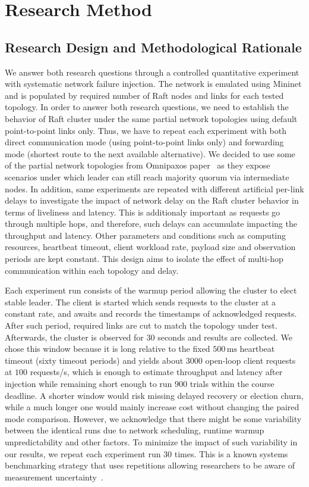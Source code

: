 \documentclass[11pt,a4paper]{article}
\begin{document}
\section{Research Method}

\subsection{Research Design and Methodological Rationale}

We answer both research questions through a controlled quantitative experiment with systematic network failure injection.
The network is emulated using Mininet and is populated by required number of Raft nodes and links for each tested topology.
In order to answer both research questions, we need to establish the behavior of Raft cluster under the same partial network topologies using default point-to-point links only.
Thus, we have to repeat each experiment with both direct communication mode (using point-to-point links only) and forwarding mode (shortest route to the next available alternative).
We decided to use some of the partial network topologies from Omnipaxos paper~\cite{ng2023omnipaxos} as they expose scenarios under which leader can still reach majority quorum via intermediate nodes.
In addition, same experiments are repeated with different artificial per-link delays to investigate the impact of network delay on the Raft cluster behavior in terms of liveliness and latency.
This is additionaly important as requests go through multiple hops, and therefore, such delays can accumulate impacting the throughput and latency.
Other parameters and conditions such as computing resources, heartbeat timeout, client workload rate, payload size and observation periods are kept constant.
This design aims to isolate the effect of multi-hop communication within each topology and delay.

Each experiment run consists of the warmup period allowing the cluster to elect stable leader. 
The client is started which sends requests to the cluster at a constant rate, and awaits and records the timestamps of acknowledged requests.
After such period, required links are cut to match the topology under test.
Afterwards, the cluster is observed for $30$ seconds and results are collected.
We chose this window because it is long relative to the fixed \(500\,\mathrm{ms}\) heartbeat timeout (sixty timeout periods) and yields about \(3000\) open-loop client requests at \(100\) requests/s, which is enough to estimate throughput and latency after injection while remaining short enough to run \(900\) trials within the course deadline.
A shorter window would risk missing delayed recovery or election churn, while a much longer one would mainly increase cost without changing the paired mode comparison.
However, we acknowledge that there might be some variability between the identical runs due to network scheduling, runtime warmup unpredictability and other factors.
To minimize the impact of such variability in our results, we repeat each experiment run $30$ times.
This is a known systems benchmarking strategy that uses repetitions allowing researchers to be aware of measurement uncertainty~\cite{kalibera2013rigorous}.
\end{document}
